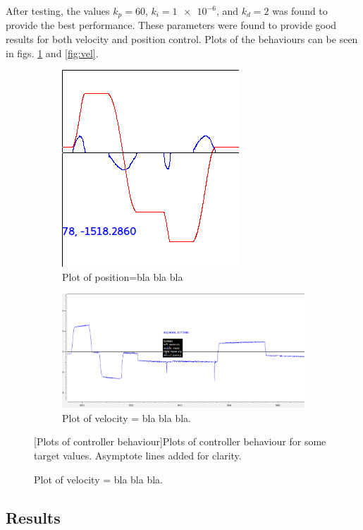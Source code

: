 \documentclass[11pt]{article}
\begin{document}
After testing, the values $k_p = 60$, $k_i = \num{1e-6}$, and $k_d = 2$ was found to provide the best performance. These parameters were found to provide good results for both velocity and position control. Plots of the behaviours can be seen in figs. \ref{fig:pos} and \vref{fig:vel}. \par

\begin{figure}[h]
  \begin{subfigure}[b]{.45\textwidth}
    \includegraphics[width=.5\textwidth]{figures/posplot.png}
    \caption{Plot of position=bla bla bla}\label{fig:pos}
  \end{subfigure} 
  \begin{subfigure}[b]{.45\textwidth}
    \includegraphics[width=.5\textwidth]{figures/velplot.png}
    \caption{Plot of velocity = bla bla bla.}    \label{fig:ve}
  \end{subfigure}
  [Plots of controller behaviour]{Plots of controller behaviour for some target values. Asymptote lines added for clarity.}
\end{figure}
\subsection{Results}
\end{document}
